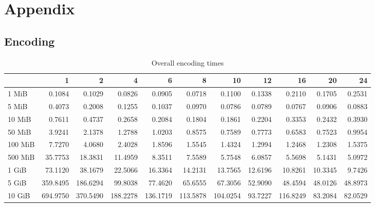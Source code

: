 \onecolumn
\pagebreak
\section{Appendix}

\subsection{Encoding}
\begin{table}[!h]
	\caption{Overall encoding times}
\begin{tabular}{lrrrrrrrrrr}
	\toprule
	\diagbox{File sizes }{Threads} &        1  &        2  &        4  &        6  &        8  &        10 &       12 &        16 &       20 &       24 \\
	\midrule
	1 MiB   &    0.1084 &    0.1029 &    0.0826 &    0.0905 &    0.0718 &    0.1100 &   0.1338 &    0.2110 &   0.1705 &   0.2531 \\
	5 MiB   &    0.4073 &    0.2008 &    0.1255 &    0.1037 &    0.0970 &    0.0786 &   0.0789 &    0.0767 &   0.0906 &   0.0883 \\
	10 MiB  &    0.7611 &    0.4737 &    0.2658 &    0.2084 &    0.1804 &    0.1861 &   0.2204 &    0.3353 &   0.2432 &   0.3930 \\
	50 MiB  &    3.9241 &    2.1378 &    1.2788 &    1.0203 &    0.8575 &    0.7589 &   0.7773 &    0.6583 &   0.7523 &   0.9954 \\
	100 MiB &    7.7270 &    4.0680 &    2.4028 &    1.8596 &    1.5545 &    1.4324 &   1.2994 &    1.2468 &   1.2308 &   1.5375 \\
	500 MiB &   35.7753 &   18.3831 &   11.4959 &    8.3511 &    7.5589 &    5.7548 &   6.0857 &    5.5698 &   5.1431 &   5.0972 \\
	1 GiB   &   73.1120 &   38.1679 &   22.5066 &   16.3364 &   14.2131 &   13.7565 &  12.6196 &   10.8261 &  10.3345 &   9.7426 \\
	5 GiB   &  359.8495 &  186.6294 &   99.8038 &   77.4620 &   65.6555 &   67.3056 &  52.9090 &   48.4594 &  48.0126 &  48.8973 \\
	10 GiB  &  694.9750 &  370.5490 &  188.2278 &  136.1719 &  113.5878 &  104.0254 &  93.7227 &  116.8249 &  83.2084 &  82.0529 \\
	\bottomrule
\end{tabular}
\end{table}
